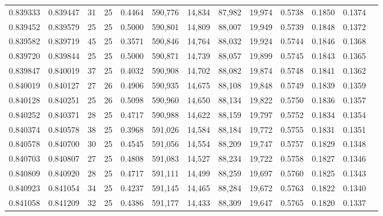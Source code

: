 \begin{tabular}{rrrrrrrrrrrrr}
0.839333 & 0.839447 &    31 &  25 &                                     0.4464 & 590,776 &  14,834 &  87,982 &  19,974 & 0.5738 & 0.1850 & 0.1374 \\
0.839452 & 0.839579 &    25 &  25 &                                     0.5000 & 590,801 &  14,809 &  88,007 &  19,949 & 0.5739 & 0.1848 & 0.1372 \\
0.839582 & 0.839719 &    45 &  25 &                                     0.3571 & 590,846 &  14,764 &  88,032 &  19,924 & 0.5744 & 0.1846 & 0.1368 \\
0.839720 & 0.839844 &    25 &  25 &                                     0.5000 & 590,871 &  14,739 &  88,057 &  19,899 & 0.5745 & 0.1843 & 0.1365 \\
0.839847 & 0.840019 &    37 &  25 &                                     0.4032 & 590,908 &  14,702 &  88,082 &  19,874 & 0.5748 & 0.1841 & 0.1362 \\
0.840019 & 0.840127 &    27 &  26 &                                     0.4906 & 590,935 &  14,675 &  88,108 &  19,848 & 0.5749 & 0.1839 & 0.1359 \\
0.840128 & 0.840251 &    25 &  26 &                                     0.5098 & 590,960 &  14,650 &  88,134 &  19,822 & 0.5750 & 0.1836 & 0.1357 \\
0.840252 & 0.840371 &    28 &  25 &                                     0.4717 & 590,988 &  14,622 &  88,159 &  19,797 & 0.5752 & 0.1834 & 0.1354 \\
0.840374 & 0.840578 &    38 &  25 &                                     0.3968 & 591,026 &  14,584 &  88,184 &  19,772 & 0.5755 & 0.1831 & 0.1351 \\
0.840578 & 0.840700 &    30 &  25 &                                     0.4545 & 591,056 &  14,554 &  88,209 &  19,747 & 0.5757 & 0.1829 & 0.1348 \\
0.840703 & 0.840807 &    27 &  25 &                                     0.4808 & 591,083 &  14,527 &  88,234 &  19,722 & 0.5758 & 0.1827 & 0.1346 \\
0.840809 & 0.840920 &    28 &  25 &                                     0.4717 & 591,111 &  14,499 &  88,259 &  19,697 & 0.5760 & 0.1825 & 0.1343 \\
0.840923 & 0.841054 &    34 &  25 &                                     0.4237 & 591,145 &  14,465 &  88,284 &  19,672 & 0.5763 & 0.1822 & 0.1340 \\
0.841058 & 0.841209 &    32 &  25 &                                     0.4386 & 591,177 &  14,433 &  88,309 &  19,647 & 0.5765 & 0.1820 & 0.1337 \\

\end{tabular}
